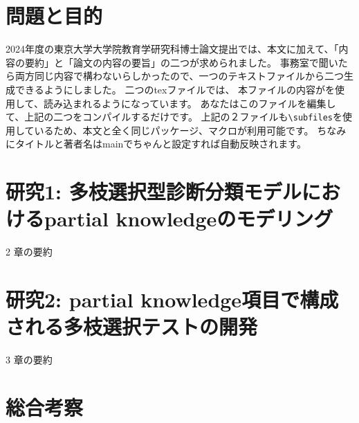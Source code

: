 \singlespacing

\section{問題と目的}
2024年度の東京大学大学院教育学研究科博士論文提出では、本文に加えて、「内容の要約」と「論文の内容の要旨」の二つが求められました。
事務室で聞いたら両方同じ内容で構わないらしかったので、一つのテキストファイルから二つ生成できるようにしました。
二つのtexファイルでは、
本ファイルの内容が\verb||を使用して、読み込まれるようになっています。
あなたはこのファイルを編集して、上記の二つをコンパイルするだけです。
上記の２ファイルも\verb|\subfiles|を使用しているため、本文と全く同じパッケージ、マクロが利用可能です。
ちなみにタイトルと著者名はmainでちゃんと設定すれば自動反映されます。
\section{研究1: 多枝選択型診断分類モデルにおけるpartial knowledgeのモデリング}
2 章の要約

\section{研究2: partial knowledge項目で構成される多枝選択テストの開発}
3 章の要約

\section{総合考察}
